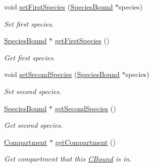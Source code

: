 \begin{DoxyCompactItemize}
void \hyperlink{classCBound_a17d4b84d683b0b7bd75b793410fed18f}{set\+First\+Species} (\hyperlink{classSpeciesBound}{Species\+Bound} $\ast$species)
\begin{DoxyCompactList}\small\item\em Set first species. \end{DoxyCompactList}\item 
\hyperlink{classSpeciesBound}{Species\+Bound} $\ast$ \hyperlink{classCBound_aad60656a671e4ffdc45b4c904fa7c320}{get\+First\+Species} ()
\begin{DoxyCompactList}\small\item\em Get first species. \end{DoxyCompactList}\item 
void \hyperlink{classCBound_a01badbb54867fb99b6f3a895d555867a}{set\+Second\+Species} (\hyperlink{classSpeciesBound}{Species\+Bound} $\ast$species)
\begin{DoxyCompactList}\small\item\em Set second species. \end{DoxyCompactList}\item 
\hyperlink{classSpeciesBound}{Species\+Bound} $\ast$ \hyperlink{classCBound_a1e706b6472c40ae1d98a64eda0acdadf}{get\+Second\+Species} ()
\begin{DoxyCompactList}\small\item\em Get second species. \end{DoxyCompactList}\item 
\hyperlink{classCompartment}{Compartment} $\ast$ \hyperlink{classCBound_a6c4d7b1b35d06725c8659424bf0c3f18}{get\+Compartment} ()
\begin{DoxyCompactList}\small\item\em Get compartment that this \hyperlink{classCBound}{C\+Bound} is in. \end{DoxyCompactList}\end{DoxyCompactItemize}

